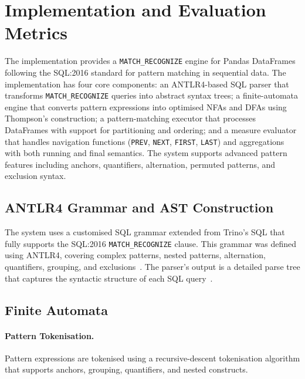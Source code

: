 \section{Implementation and Evaluation Metrics}
\label{sec:meth-impl}

The implementation provides a \texttt{MATCH\_RECOGNIZE} engine for Pandas
DataFrames following the SQL:2016 standard for pattern matching in
sequential data.  The implementation has four core components: an
ANTLR4-based SQL parser that transforms \texttt{MATCH\_RECOGNIZE}
queries into abstract syntax trees; a finite-automata engine that
converts pattern expressions into optimised NFAs and DFAs using
Thompson's construction; a pattern-matching executor that processes
DataFrames with support for partitioning and ordering; and a measure
evaluator that handles navigation functions (\texttt{PREV},
\texttt{NEXT}, \texttt{FIRST}, \texttt{LAST}) and aggregations with
both running and final semantics.  The system supports advanced
pattern features including anchors, quantifiers, alternation,
permuted patterns, and exclusion syntax.

\subsection{ANTLR4 Grammar and AST Construction}
\label{subsec:impl-antlr4}

The system uses a customised SQL grammar extended from Trino's SQL
that fully supports the SQL:2016 \texttt{MATCH\_RECOGNIZE} clause.
This grammar was defined using ANTLR4, covering complex patterns,
nested patterns, alternation, quantifiers, grouping, and
exclusions~\cite{antlr_trino_sql}.  The parser's output is a
detailed parse tree that captures the syntactic structure of each
SQL query~\cite{parr2013definitive,tarazona2021antlr}.

\subsection{Finite Automata}
\label{subsec:impl-automata}

\paragraph{Pattern Tokenisation.}
Pattern expressions are tokenised using a recursive-descent
tokenisation algorithm that supports anchors, grouping,
quantifiers, and nested constructs.

